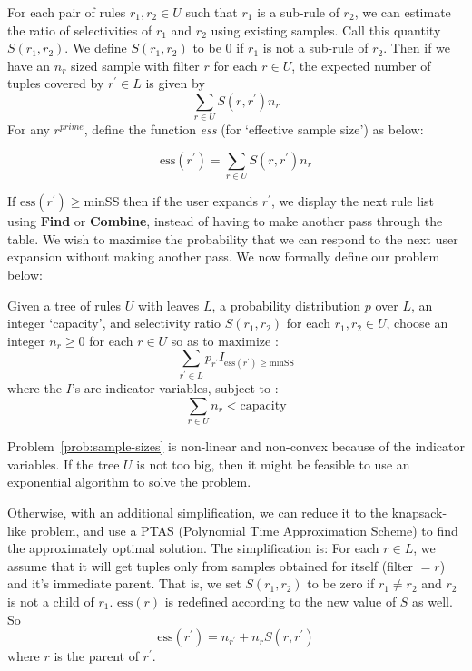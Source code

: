 For each pair of rules $r_1, r_2 \in U$ such that $r_1$ is a sub-rule of $r_2$, we can estimate the ratio of selectivities of $r_1$ and $r_2$ using existing samples. Call this quantity $S(r_1, r_2)$. We define $S(r_1, r_2)$ to be $0$ if $r_1$ is not a sub-rule of $r_2$. Then if we have an $n_r$ sized sample with filter $r$ for each $r \in U$, the expected number of tuples covered by $r^{\prime} \in L$ is given by $$\sum_{r \in U} S(r, r^{\prime})n_r$$ For any $r^{prime}$, define the function {\em ess} (for `effective sample size') as below: 
\begin{definition}\label{def:ess}
$$\text{ess}(r^{\prime}) = \sum_{r \in U} S(r, r^{\prime})n_r$$ 
\end{definition}
If $\text{ess}(r^{\prime}) \geq \text{minSS}$ then if the user expands $r^{\prime}$, we display the next rule list using \textbf{Find} or \textbf{Combine}, instead of having to make another pass through the table. We wish to maximise the probability that we can respond to the next user expansion without making another pass. We now formally define our problem below:
\begin{problem}\label{prob:sample-sizes}
Given a tree of rules $U$ with leaves $L$, a probability distribution $p$ over $L$, an integer `capacity', and selectivity ratio $S(r_1, r_2)$ for each $r_1, r_2 \in U$, 
choose an integer $n_r \geq 0$ for each $r \in U$ so as to $\textrm{maximize}$ :
$$\sum_{r^{\prime} \in L} p_{r^{\prime}}I_{\text{ess}(r^{\prime}) \geq \text{minSS}}$$
where the $I$'s are indicator variables, subject to :
$$\sum_{r \in U} n_r < \text{capacity}$$
\end{problem}
Problem~\ref{prob:sample-sizes} is non-linear and non-convex because of the indicator variables. If the tree $U$ is not too big, then it might be feasible to use an exponential algorithm to solve the problem. 

Otherwise, with an additional simplification, we can reduce it to the knapsack-like problem, and use a PTAS (Polynomial Time Approximation Scheme) to find the approximately optimal solution. The simplification is: For each $r \in L$, we assume that it will get tuples only from samples obtained for itself (filter $= r$) and it's immediate parent. That is, we set $S(r_1, r_2)$ to be zero if $r_1 \neq r_2$ and $r_2$ is not a child of $r_1$. $\text{ess}(r)$ is redefined according to the new value of $S$ as well. So $$\text{ess}(r^{\prime}) = n_{r^{\prime}} + n_rS(r, r^{\prime})$$ where $r$ is the parent of $r^{\prime}$. 

